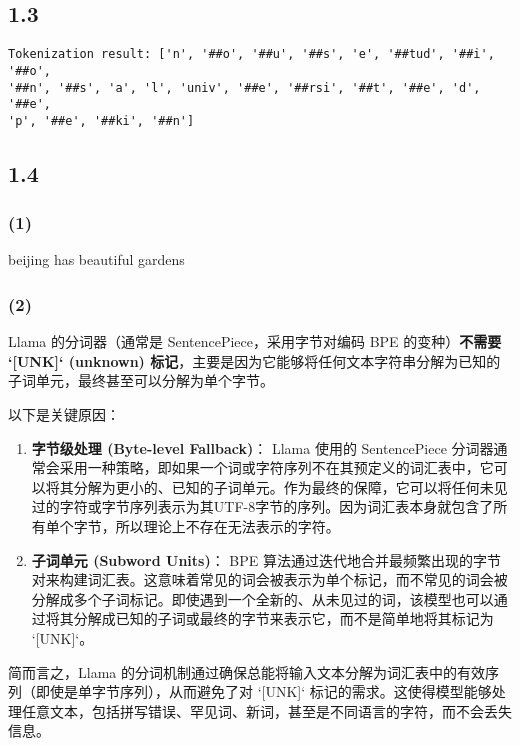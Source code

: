 \documentclass[12pt,letterpaper]{article}
\begin{document}
\subsection*{1.3}
\begin{verbatim}
Tokenization result: ['n', '##o', '##u', '##s', 'e', '##tud', '##i', '##o',
'##n', '##s', 'a', 'l', 'univ', '##e', '##rsi', '##t', '##e', 'd', '##e',
'p', '##e', '##ki', '##n']
\end{verbatim}



\subsection*{1.4}
\subsubsection*{(1)}
beijing has beautiful gardens



\subsubsection*{(2)}
Llama 的分词器（通常是 SentencePiece，采用字节对编码 BPE 的变种）\textbf{不需要 `[UNK]` (unknown) 标记}，主要是因为它能够将任何文本字符串分解为已知的子词单元，最终甚至可以分解为单个字节。

以下是关键原因：

\begin{enumerate}
    \item \textbf{字节级处理 (Byte-level Fallback)}：
    Llama 使用的 SentencePiece 分词器通常会采用一种策略，即如果一个词或字符序列不在其预定义的词汇表中，它可以将其分解为更小的、已知的子词单元。作为最终的保障，它可以将任何未见过的字符或字节序列表示为其UTF-8字节的序列。因为词汇表本身就包含了所有单个字节，所以理论上不存在无法表示的字符。

    \item \textbf{子词单元 (Subword Units)}：
    BPE 算法通过迭代地合并最频繁出现的字节对来构建词汇表。这意味着常见的词会被表示为单个标记，而不常见的词会被分解成多个子词标记。即使遇到一个全新的、从未见过的词，该模型也可以通过将其分解成已知的子词或最终的字节来表示它，而不是简单地将其标记为 `[UNK]`。
\end{enumerate}

简而言之，Llama 的分词机制通过确保总能将输入文本分解为词汇表中的有效序列（即使是单字节序列），从而避免了对 `[UNK]` 标记的需求。这使得模型能够处理任意文本，包括拼写错误、罕见词、新词，甚至是不同语言的字符，而不会丢失信息。
\end{document}
